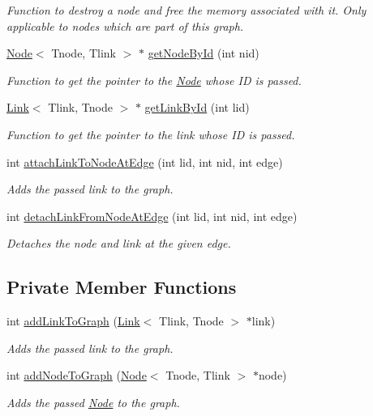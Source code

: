 \begin{DoxyCompactItemize}
\begin{DoxyCompactList}\small\item\em Function to destroy a node and free the memory associated with it. Only applicable to nodes which are part of this graph. \end{DoxyCompactList}\item 
\hyperlink{classNode}{Node}$<$ Tnode, Tlink $>$ $\ast$ \hyperlink{classGraph_ad19bc391954e8df145149acfbdbba0cd}{get\-Node\-By\-Id} (int nid)
\begin{DoxyCompactList}\small\item\em Function to get the pointer to the \hyperlink{classNode}{Node} whose I\-D is passed. \end{DoxyCompactList}\item 
\hyperlink{classLink}{Link}$<$ Tlink, Tnode $>$ $\ast$ \hyperlink{classGraph_a2c205de5e88b199f24d1993e829df4b6}{get\-Link\-By\-Id} (int lid)
\begin{DoxyCompactList}\small\item\em Function to get the pointer to the link whose I\-D is passed. \end{DoxyCompactList}\item 
int \hyperlink{classGraph_ad7a9773e4b36196df9221116c8a7abd7}{attach\-Link\-To\-Node\-At\-Edge} (int lid, int nid, int edge)
\begin{DoxyCompactList}\small\item\em Adds the passed link to the graph. \end{DoxyCompactList}\item 
int \hyperlink{classGraph_a045bcbd5cfbbf87bc55deab5f0be477a}{detach\-Link\-From\-Node\-At\-Edge} (int lid, int nid, int edge)
\begin{DoxyCompactList}\small\item\em Detaches the node and link at the given edge. \end{DoxyCompactList}\end{DoxyCompactItemize}
\subsection*{Private Member Functions}
\begin{DoxyCompactItemize}
\item 
int \hyperlink{classGraph_afe92a65949d7bdc372feb09f99e4f5cf}{add\-Link\-To\-Graph} (\hyperlink{classLink}{Link}$<$ Tlink, Tnode $>$ $\ast$link)
\begin{DoxyCompactList}\small\item\em Adds the passed link to the graph. \end{DoxyCompactList}\item 
int \hyperlink{classGraph_ab2a7e149c924c444167097295f404566}{add\-Node\-To\-Graph} (\hyperlink{classNode}{Node}$<$ Tnode, Tlink $>$ $\ast$node)
\begin{DoxyCompactList}\small\item\em Adds the passed \hyperlink{classNode}{Node} to the graph. \end{DoxyCompactList}\end{DoxyCompactItemize}
